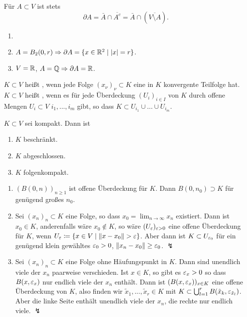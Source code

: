 \begin{bemerkung*}
	F\"ur $ A\subset V $ ist stets \[ \partial A=\bar A\cap \overline{A^c}=\bar A\cap (\overline{V\setminus A}). \]
\end{bemerkung*}
\begin{beispiel*}
	\begin{enumerate}
		\item[]
		\item $ A=B_2(0,r)\Rightarrow\partial A=\lbrace x\in\mathbb{R}^2\mid |x|=r\rbrace $.
		\item $ V=\mathbb{R} $, $ A=\mathbb{Q}\Rightarrow\partial A=\mathbb{R} $.
	\end{enumerate}
\end{beispiel*}
\begin{bemerkung*}[Erinnerung]
	$ K\subset V $ hei\ss t , wenn jede Folge $ (x_\nu)_\nu\subset K $ eine in $ K $ konvergente Teilfolge hat.\\
	$ K\subset V $ hei\ss t , wenn es f\"ur jede \"Uberdeckung $ (U_i)_{i\in I} $ von $ K $ durch offene Mengen $ U_i\subset V $ $ i_1,...,i_m $ gibt, so dass $ K\subset U_{i_1}\cup...\cup U_{i_m} $.
\end{bemerkung*}
\begin{lemma}
	$ K\subset V $ sei kompakt. Dann ist
	\begin{enumerate}
		\item $ K $ beschr\"ankt.
		\item $ K $ abgeschlossen.
		\item $ K $ folgenkompakt.
	\end{enumerate}
\end{lemma}
\begin{beweis}
	\begin{enumerate}
		\item $ (B(0,n))_{n\geq 1} $ ist offene \"Uberdeckung f\"ur $ K $. Dann $ B(0,n_0)\supset K $ f\"ur gen\"ugend gro\ss es $ n_0 $.
		\item Sei $ (x_n)_n\subset K $ eine Folge, so dass $ x_0=\lim_{n\to\infty} x_n $ existiert. Dann ist $ x_0\in K $, anderenfalls w\"are $ x_0\notin K $, so w\"are $ (U_\varepsilon)_{\varepsilon>0} $ eine offene \"Uberdeckung f\"ur $ K $, wenn $ U_\e\coloneqq\lbrace x\in V\mid\norm{x-x_0}>\e\rbrace $. Aber dann ist $ K\subset U_{\varepsilon_0} $ f\"ur ein gen\"ugend klein gew\"ahltes $ \varepsilon_0>0 $, $ \left\|x_n-x_0\right\|\geq\varepsilon_0$. $\lightning $
		\item Sei $ (x_n)_n\subset K $ eine Folge ohne H\"aufungspunkt in $ K $. Dann sind unendlich viele der $ x_n $ paarweise verschieden. Ist $ x\in K $, so gibt es $ \varepsilon_x>0 $ so dass $ B(x,\varepsilon_x) $ nur endlich viele der $ x_n $ enth\"alt. Dann ist $ (B(x,\varepsilon_x))_{x\in K} $ eine offene \"Uberdeckung von $ K $, also finden wir $ \tilde x_1,...,\tilde x_r\in K $ mit $ K\subset\bigcup_{l=1}^r B(\tilde x_k,\varepsilon_{\tilde x_l}) $. Aber die linke Seite enth\"alt unendlich viele der $ x_n $, die rechte nur endlich viele. $ \lightning $
	\end{enumerate}
\end{beweis}
